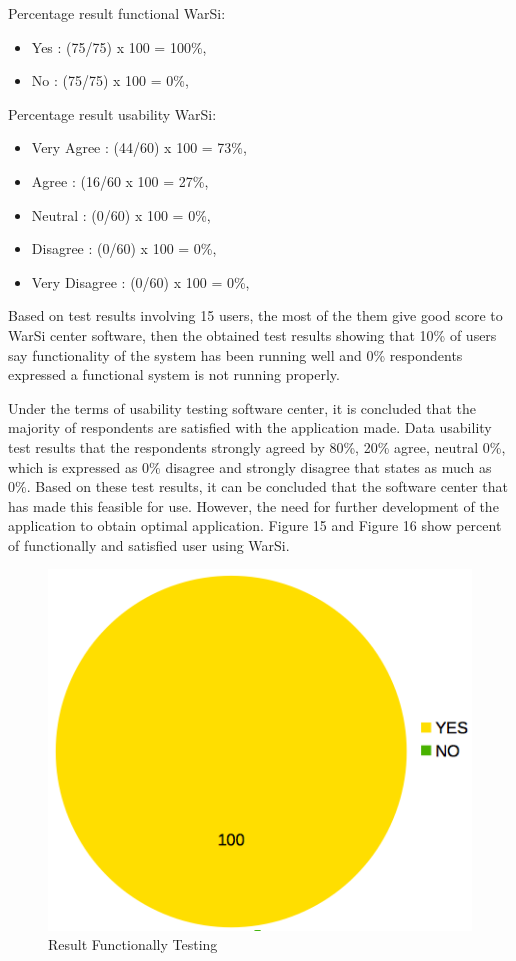 \documentclass[conference, letterpaper]{IEEEtran}
\begin{document}
Percentage result functional WarSi:
\begin{itemize}
\item Yes : (75/75) x 100 = 100\%,
\item No : (75/75) x 100 = 0\%,
\end{itemize}

Percentage result usability WarSi:
\begin{itemize}
\item Very Agree : (44/60) x 100 = 73\%,
\item Agree : (16/60 x 100 = 27\%,
\item Neutral : (0/60) x 100 = 0\%,
\item Disagree : (0/60) x 100 = 0\%,
\item Very Disagree : (0/60) x 100 = 0\%,
\end{itemize}

Based on test results involving 15 users, the most of the them give good score to WarSi center software, then the obtained test results showing that 10\% of users say functionality of the system has been running well and 0\% respondents expressed a functional system is not running properly. 

Under the terms of usability testing software center, it is concluded that the majority of respondents are satisfied with the application made. Data usability test results that the respondents strongly agreed by 80\%, 20\% agree, neutral 0\%, which is expressed as 0\% disagree and strongly disagree that states as much as 0\%. Based on these test results, it can be concluded that the software center that has made this feasible for use. However, the need for further development of the application to obtain optimal application. Figure 15 and Figure 16 show percent of functionally and satisfied user using WarSi.

\begin{figure}[!t]
\centering
\includegraphics[scale=0.5]{image/functionally.png}
\caption{Result Functionally Testing}
\end{figure}
\end{document}
